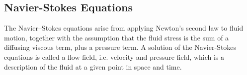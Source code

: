 \subsection{Navier-Stokes Equations} 
The Navier–Stokes equations arise from applying Newton's second law to fluid motion, together with the assumption that the fluid stress is the sum of a diffusing viscous term, plus a pressure term. A solution of the Navier-Stokes equations is called a flow field, i.e. velocity and pressure field, which is a description of the fluid at a given point in space and time. 

% 
% 
% 
